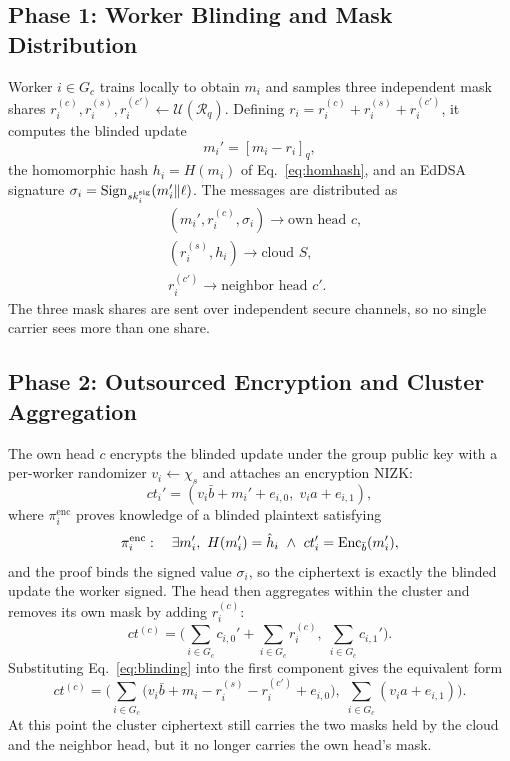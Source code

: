 \subsection{Phase 1: Worker Blinding and Mask Distribution}
\label{subsec:phase1}
Worker $i\in G_c$ trains locally to obtain $m_i$ and samples three independent mask shares $r_i^{(c)},r_i^{(s)},r_i^{(c')}\leftarrow\mathcal{U}(\mathcal{R}_q)$. Defining $r_i=r_i^{(c)}+r_i^{(s)}+r_i^{(c')}$, it computes the blinded update
\begin{equation}
  \label{eq:blinding}
  m_i'=[m_i-r_i]_q ,
\end{equation}
the homomorphic hash $h_i=H(m_i)$ of Eq.~\eqref{eq:homhash}, and an EdDSA signature $\sigma_i=\operatorname{Sign}_{sk_i^{\mathrm{sig}}}(m_i'\Vert\ell)$. The messages are distributed as
\begin{equation}
  \label{eq:distribution}
  \begin{aligned}
    &(m_i',r_i^{(c)},\sigma_i)\to \text{own head }c,\\
    &(r_i^{(s)},h_i)\to \text{cloud }S,\\
    &r_i^{(c')}\to \text{neighbor head }c'.
  \end{aligned}
\end{equation}
The three mask shares are sent over independent secure channels, so no single carrier sees more than one share.

\subsection{Phase 2: Outsourced Encryption and Cluster Aggregation}
\label{subsec:phase2}
The own head $c$ encrypts the blinded update under the group public key with a per-worker randomizer $v_i\leftarrow\chi_s$ and attaches an encryption NIZK:
\begin{equation}
  \label{eq:individual-ct}
  ct_i'=(v_i\bar b+m_i'+e_{i,0},\; v_i a+e_{i,1}),
\end{equation}
where $\pi_i^{\mathrm{enc}}$ proves knowledge of a blinded plaintext satisfying
\begin{equation}
  \pi_i^{\mathrm{enc}}:\quad \exists m_i',\ H(m_i')=\hat h_i\ \wedge\ ct_i'=\Enc_{\bar b}(m_i'),
\end{equation}
and the proof binds the signed value $\sigma_i$, so the ciphertext is exactly the blinded update the worker signed. The head then aggregates within the cluster and removes its own mask by adding $r_i^{(c)}$:
\begin{equation}
  \label{eq:cluster-ct}
  ct^{(c)}=\Big(\sum_{i\in G_c} c_{i,0}'+\sum_{i\in G_c} r_i^{(c)},\; \sum_{i\in G_c} c_{i,1}'\Big).
\end{equation}
Substituting Eq.~\eqref{eq:blinding} into the first component gives the equivalent form
\begin{equation}
  \label{eq:cluster-expanded}
  ct^{(c)}=\Big(\sum_{i\in G_c}\big(v_i\bar b+m_i-r_i^{(s)}-r_i^{(c')}+e_{i,0}\big),\; \sum_{i\in G_c}(v_i a+e_{i,1})\Big).
\end{equation}
At this point the cluster ciphertext still carries the two masks held by the cloud and the neighbor head, but it no longer carries the own head's mask.

